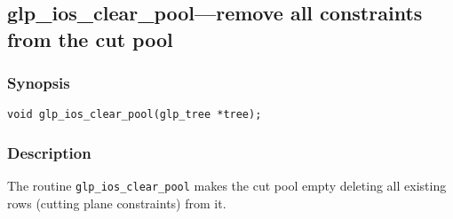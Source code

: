 \newpage

\subsection{glp\_ios\_clear\_pool---remove all constraints from the
cut pool}

\subsubsection*{Synopsis}

\begin{verbatim}
void glp_ios_clear_pool(glp_tree *tree);
\end{verbatim}

\subsubsection*{Description}

The routine \verb|glp_ios_clear_pool| makes the cut pool empty deleting
all existing rows (cutting plane constraints) from it.

